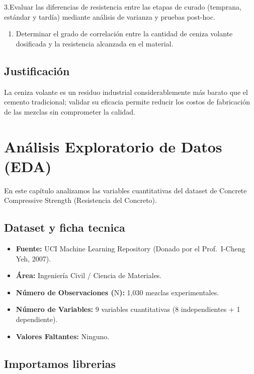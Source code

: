 \documentclass[
]{book}
\providecommand{\tightlist}{%
  \setlength{\itemsep}{0pt}\setlength{\parskip}{0pt}}
\begin{document}
3.Evaluar las diferencias de resistencia entre las etapas de curado (temprana, estándar y tardía) mediante análisis de varianza y pruebas post-hoc.

\begin{enumerate}
\def\labelenumi{\arabic{enumi}.}
\setcounter{enumi}{3}
\tightlist
\item
  Determinar el grado de correlación entre la cantidad de ceniza volante dosificada y la resistencia alcanzada en el material.
\end{enumerate}

\section{Justificación}\label{justificaciuxf3n}

La ceniza volante es un residuo industrial considerablemente más barato que el cemento tradicional; validar su eficacia permite reducir los costos de fabricación de las mezclas sin comprometer la calidad.

\chapter{Análisis Exploratorio de Datos (EDA)}\label{eda}

En este capítulo analizamos las variables cuantitativas del dataset de Concrete Compressive Strength (Resistencia del Concreto).

\section{Dataset y ficha tecnica}\label{dataset-y-ficha-tecnica}

\begin{itemize}
\item
  \textbf{Fuente:} UCI Machine Learning Repository (Donado por el Prof.~I-Cheng Yeh, 2007).
\item
  \textbf{Área:} Ingeniería Civil / Ciencia de Materiales.
\item
  \textbf{Número de Observaciones (}N\textbf{):} 1,030 mezclas experimentales.
\item
  \textbf{Número de Variables:} 9 variables cuantitativas (8 independientes + 1 dependiente).
\item
  \textbf{Valores Faltantes:} Ninguno.
\end{itemize}

\section{Importamos librerias}\label{importamos-librerias}
\end{document}
